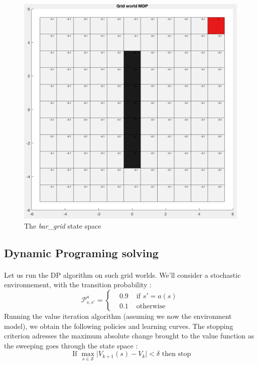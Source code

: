 \documentclass[a4paper]{report}
\begin{document}
{{\begin{figure}[ht!]
\begin{minipage}{0.4\linewidth}
					\includegraphics[width=\linewidth]{bar_grid}
					\caption{The \emph{bar\_grid} state space}
				\end{minipage}
			\end{figure}
			\subsection{Dynamic Programing solving}
			{
				\paragraph{} Let us run the DP algorithm on such grid worlds. We'll consider a stochastic environnement, with the transition probability : 
				\begin{equation}
					\mathcal{P}_{s,s'}^a = \left\{\begin{aligned} &0.9 &\text{ if }s' = a(s) \\ &0.1 &\text{ otherwise} \end{aligned}\right.
				\end{equation}
				Running the value iteration algorithm (assuming we now the environment model), we obtain the following policies and learning curves. The stopping criterion adresses the maximum absolute change brought to the value function as the sweeping goes through the state space : 
				\begin{equation}
					\text{ If } \max_{s\in\mathcal{S}} \vert V_{k+1}(s) - V_k \vert < \delta \text{ then stop}
				\end{equation}
				
}}}
\end{document}
